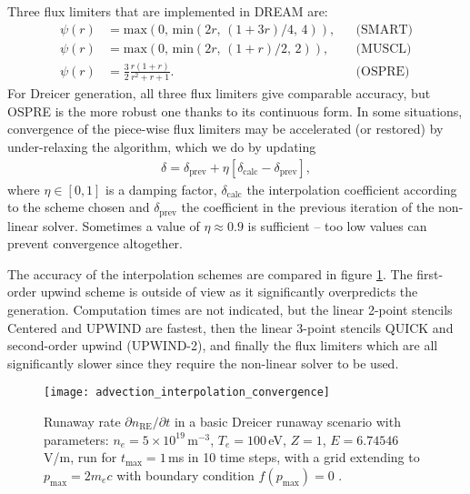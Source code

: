 \documentclass{notes}
\begin{document}
    Three flux limiters that are implemented in DREAM are:
    \begin{align}
    \psi(r) &= \text{max}(0,\,\text{min}(2r,\,(1+3r)/4,\,4)), && \text{(SMART)} \nonumber \\
    \psi(r) &= \text{max}(0,\,\text{min}(2r,\,(1+r)/2,\,2)), && \text{(MUSCL)} \nonumber \\
    \psi(r) &= \frac{3}{2}\frac{r(1+r)}{r^2+r+1}. && \text{(OSPRE)}
    \end{align}
    For Dreicer generation, all three flux limiters give comparable accuracy, but OSPRE is the 
    more robust one thanks to its continuous form. 
    In some situations, convergence of the piece-wise flux limiters may be accelerated (or restored)
    by under-relaxing the algorithm, which we do by updating
    \begin{align}
    \delta = \delta_\text{prev} + \eta [\delta_\text{calc} - \delta_\text{prev}],
    \end{align}
    where $\eta \in [0,1]$ is a damping factor, $\delta_\text{calc}$ the interpolation coefficient
    according to the scheme chosen and $\delta_\text{prev}$ the coefficient in the previous iteration 
    of the non-linear solver. Sometimes a value of $\eta \approx 0.9$ is sufficient -- too low
    values can prevent convergence altogether.
    
    The accuracy of the interpolation schemes are compared in figure \ref{fig:advection interpolation convergence}.
    The first-order upwind scheme is outside of view as it significantly overpredicts the generation. Computation times 
    are not indicated, but the linear 2-point stencils Centered and UPWIND are fastest, then the linear 3-point stencils 
    QUICK and second-order upwind (UPWIND-2), and finally the flux limiters which are all significantly slower since 
    they require the non-linear solver to be used.
    
    \begin{figure}
    \begin{center}
    \texttt{[image: advection\_interpolation\_convergence]}
    \caption{\label{fig:advection interpolation convergence} Runaway rate $\partial n_\mathrm{RE}/\partial t$ in 
    a basic Dreicer runaway scenario with parameters: $n_e = 5\times 10^{19}\,$m$^{-3}$, $T_e = 100\,$eV, $Z=1$, 
    $E=6.74546\,$V/m, run for $t_\mathrm{max}=1$\,ms in 10 time steps, with a grid extending to 
    $p_\mathrm{max} = 2m_e c$ with boundary condition $f(p_\mathrm{max})=0$ .}
    \end{center}
    \end{figure}
\end{document}
